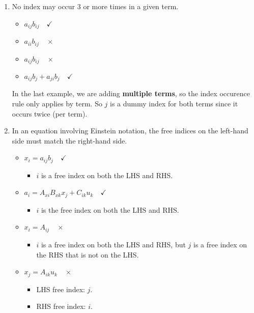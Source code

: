 \begin{enumerate}[label=\textbf{Rule \arabic*}:, leftmargin=*, labelsep=1em]
\begin{itemize}
          \end{itemize}
    \item No index may occur 3 or more times in a given term.
          \begin{itemize}
              \item $a_{ij}b_{ij}\quad \checkmark$
              \item $a_{ii}b_{ij}\quad \times$
              \item $a_{ij}b_{ij}\quad \times$
              \item $a_{ij}b_{j} + a_{ji}b_{j} \quad \checkmark$
          \end{itemize}
          In the last example, we are adding \textbf{multiple terms}, so the index occurence rule only applies by term. So $j$ is a dummy index for both terms since it occurs twice (per term).
    \item In an equation involving Einstein notation, the free indices on the left-hand side must match the right-hand side.
          \begin{itemize}
              \item $x_i = a_{ij}b_j \quad \checkmark$
                    \begin{itemize}
                        \item $i$ is a free index on both the LHS and RHS.
                    \end{itemize}

              \item $a_i = A_{xi}B_{xk} x_j + C_{ik}u_k \quad \checkmark$
                    \begin{itemize}
                        \item $i$ is the free index on both the LHS and RHS.
                    \end{itemize}

              \item $x_i = A_{ij} \quad \times$
                    \begin{itemize}
                        \item $i$ is a free index on both the LHS and RHS, but $j$ is a free index on the RHS that is not on the LHS.
                    \end{itemize}

              \item $x_j = A_{ik}u_k \quad \times$
                    \begin{itemize}
                        \item LHS free index: $j$.
                        \item RHS free index: $i$.
                    \end{itemize}


\end{itemize}
\end{enumerate}
